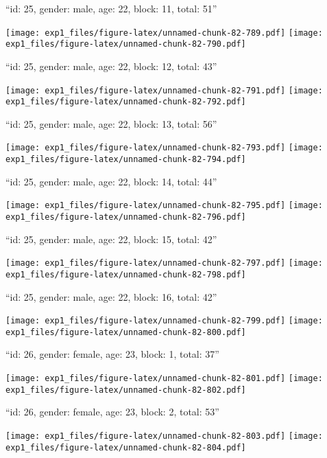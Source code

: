 \documentclass[11pt,,]{article}
\begin{document}
\newpage
[1] 

``id: 25, gender: male, age: 22, block: 11, total: 51''

\texttt{[image: exp1\_files/figure-latex/unnamed-chunk-82-789.pdf]}
\texttt{[image: exp1\_files/figure-latex/unnamed-chunk-82-790.pdf]}

\newpage
[1] 

``id: 25, gender: male, age: 22, block: 12, total: 43''

\texttt{[image: exp1\_files/figure-latex/unnamed-chunk-82-791.pdf]}
\texttt{[image: exp1\_files/figure-latex/unnamed-chunk-82-792.pdf]}

\newpage
[1] 

``id: 25, gender: male, age: 22, block: 13, total: 56''

\texttt{[image: exp1\_files/figure-latex/unnamed-chunk-82-793.pdf]}
\texttt{[image: exp1\_files/figure-latex/unnamed-chunk-82-794.pdf]}

\newpage
[1] 

``id: 25, gender: male, age: 22, block: 14, total: 44''

\texttt{[image: exp1\_files/figure-latex/unnamed-chunk-82-795.pdf]}
\texttt{[image: exp1\_files/figure-latex/unnamed-chunk-82-796.pdf]}

\newpage
[1] 

``id: 25, gender: male, age: 22, block: 15, total: 42''

\texttt{[image: exp1\_files/figure-latex/unnamed-chunk-82-797.pdf]}
\texttt{[image: exp1\_files/figure-latex/unnamed-chunk-82-798.pdf]}

\newpage
[1] 

``id: 25, gender: male, age: 22, block: 16, total: 42''

\texttt{[image: exp1\_files/figure-latex/unnamed-chunk-82-799.pdf]}
\texttt{[image: exp1\_files/figure-latex/unnamed-chunk-82-800.pdf]}

\newpage
[1] 

``id: 26, gender: female, age: 23, block: 1, total: 37''

\texttt{[image: exp1\_files/figure-latex/unnamed-chunk-82-801.pdf]}
\texttt{[image: exp1\_files/figure-latex/unnamed-chunk-82-802.pdf]}

\newpage
[1] 

``id: 26, gender: female, age: 23, block: 2, total: 53''

\texttt{[image: exp1\_files/figure-latex/unnamed-chunk-82-803.pdf]}
\texttt{[image: exp1\_files/figure-latex/unnamed-chunk-82-804.pdf]}
\end{document}
